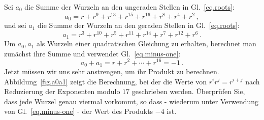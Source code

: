 Sei $a_0$ die Summe der Wurzeln an den ungeraden Stellen in Gl.~\ref{eq.roots}:
\[
a_0=r + r^9 + r^{13} +r^{15} +r^{16} + r^8+r^4+r^2\,,
\]
und sei $a_1$ die Summe der Wurzeln an den geraden Stellen in Gl.~\ref{eq.roots}:
\[
a_1=r^3 + r^{10} + r^{5} +r^{11} +r^{14} + r^7+r^{12}+r^6\,.
\]
Um $a_0,a_1$ als Wurzeln einer quadratischen Gleichung zu erhalten, berechnet man zunächst ihre Summe und verwendet Gl.~\ref{eq.minus-one}:
\[
a_0+a_1=r + r^2 + \cdots +r^{16}=-1\,.
\]
Jetzt müssen wir uns sehr anstrengen, um ihr Produkt zu berechnen. Abbildung~\ref{fig.a0a1} zeigt die Berechnung, bei der die Werte von $r^ir^j=r^{i+j}$ nach Reduzierung der Exponenten modulo $17$ geschrieben werden. Überprüfen Sie, dass jede Wurzel genau viermal vorkommt, so dass - wiederum unter Verwendung von Gl.~\ref{eq.minus-one} - der Wert des Produkts $-4$ ist.

